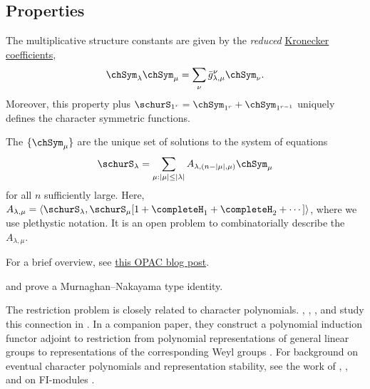 \subsection[charSymFuncProps]{Properties}

The multiplicative structure constants are given by 
the \emph{reduced} \hyperref[schurKroneckerCoefficients]{Kronecker coefficients},
\[
\chSym_\lambda \chSym_\mu = \sum_{\nu} \bar{g}^{\nu}_{\lambda,\mu} \chSym_\nu.
\]
Moreover, this property plus $\schurS_{1^r} = \chSym_{1^r}+\chSym_{1^{r-1}}$
uniquely defines the character symmetric functions.


The $\{\chSym_\mu\}$ are the unique set of solutions to the system of equations
\[
 \schurS_\lambda = \sum_{\mu : |\mu| \leq |\lambda|} A_{\lambda,(n-|\mu|,\mu)} \chSym_\mu
\]
for all $n$ sufficiently large.
Here,
$A_{\lambda,\mu}
 = \langle \schurS_\lambda,
 \schurS_\mu[1 + \completeH_1 + \completeH_2 + \dotsb] \rangle$,
where we use plethystic notation.
It is an open problem to combinatorially describe the $A_{\lambda,\mu}$.

For a brief overview, see \href{https://realopacblog.wordpress.com/2019/11/17/the-restriction-problem/}{this OPAC blog post}.

 and  prove a Murnaghan--Nakayama type identity.


The restriction problem is closely related to character polynomials.
, , ,
and  study this connection in
\cite{NarayananPaulPrasadSrivastava2021character}.  In a companion paper,
they construct a polynomial induction functor adjoint to restriction from
polynomial representations of general linear groups to representations of
the corresponding Weyl groups \cite{NarayananPaulPrasadSrivastava2021polynomial}.
For background on eventual character polynomials and representation stability,
see the work of , , and
 on FI-modules \cite{ChurchEllenbergFarb2015}.
